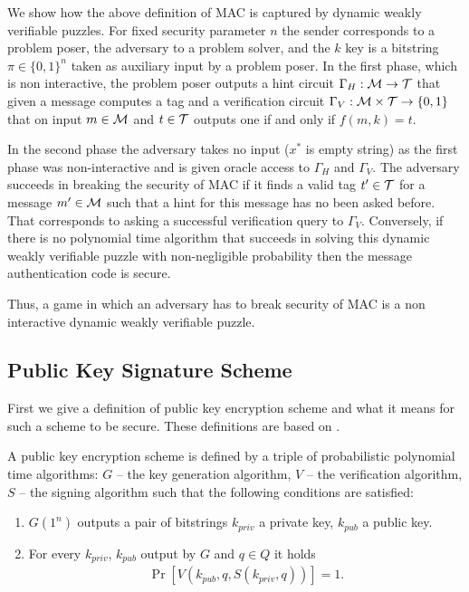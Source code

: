 \documentclass[11pt,a4paper,titlepage]{memoir}
\begin{document}
We show how the above definition of MAC is captured by dynamic weakly verifiable puzzles.
For fixed security parameter $n$ the sender corresponds to a problem poser, the adversary to a problem solver, and
the $k$ key is a bitstring $\pi \in \{0,1\}^{n}$ taken as auxiliary input by a problem poser.
In the first phase, which is non interactive, the problem poser outputs a hint circuit
$\Gamma_H: \mathcal{M} \rightarrow \mathcal{T}$ that given a message computes a tag
and a verification circuit $\Gamma_V: \mathcal{M} \times \mathcal{T} \rightarrow \{0,1\}$ that on input $m \in \mathcal{M}$ and $t \in \mathcal{T}$
outputs one if and only if $f(m, k) = t$.

In the second phase the adversary takes no input ($x^*$ is empty string) as the first phase was non-interactive and
is given oracle access to $\Gamma_H$ and $\Gamma_V$.
The adversary succeeds in breaking the security of MAC if it finds a valid tag $t' \in \mathcal{T}$ for a message $m' \in \mathcal{M}$ such that a hint for this message
has no been asked before. That corresponds to asking a successful verification query to $\Gamma_V$.
Conversely, if there is no polynomial time algorithm that succeeds in solving this dynamic weakly verifiable puzzle with non-negligible probability
then the message authentication code is secure.

Thus, a game in which an adversary has to break security of MAC is a non interactive dynamic weakly verifiable puzzle.
%
\subsection{Public Key Signature Scheme}
First we give a definition of public key encryption scheme and what it means for such a scheme to be secure.
These definitions are based on \cite{Goldreich:2004:FCV:975541}.

\begin{definition}
A public key encryption scheme is defined by a triple of probabilistic polynomial time algorithms:
$G$ -- the key generation algorithm, $V$ -- the verification algorithm, $S$ -- the signing algorithm such that the following conditions are satisfied:
\begin{enumerate}[-]
  \item $G(1^n)$ outputs a pair of bitstrings $k_{priv}$ a private key, $k_{pub}$ a public key.
  \item For every $k_{priv}$, $k_{pub}$ output by $G$ and $q \in Q$ it holds
    \begin{align*}
      \Pr[V(k_{pub}, q, S(k_{priv}, q))] = 1.
    \end{align*}
\end{enumerate}
\end{definition}
\end{document}

